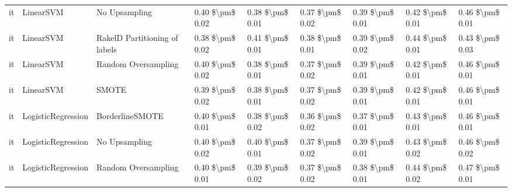 \begin{tabular}{lllllllll}
      it &                       LinearSVM &                 No Upsampling & 0.40 \$\textbackslash pm\$ 0.02 &           0.38 \$\textbackslash pm\$ 0.01 &       0.37 \$\textbackslash pm\$ 0.02 &        0.39 \$\textbackslash pm\$ 0.01 &                         0.42 \$\textbackslash pm\$ 0.01 &     0.46 \$\textbackslash pm\$ 0.01 \\
      it &                       LinearSVM & RakelD Partitioning of labels & 0.38 \$\textbackslash pm\$ 0.02 &           0.41 \$\textbackslash pm\$ 0.01 &       0.38 \$\textbackslash pm\$ 0.01 &        0.39 \$\textbackslash pm\$ 0.02 &                         0.44 \$\textbackslash pm\$ 0.01 &     0.43 \$\textbackslash pm\$ 0.03 \\
      it &                       LinearSVM &           Random Oversampling & 0.40 \$\textbackslash pm\$ 0.02 &           0.38 \$\textbackslash pm\$ 0.01 &       0.37 \$\textbackslash pm\$ 0.02 &        0.39 \$\textbackslash pm\$ 0.01 &                         0.42 \$\textbackslash pm\$ 0.01 &     0.46 \$\textbackslash pm\$ 0.01 \\
      it &                       LinearSVM &                         SMOTE & 0.39 \$\textbackslash pm\$ 0.02 &           0.38 \$\textbackslash pm\$ 0.01 &       0.37 \$\textbackslash pm\$ 0.02 &        0.39 \$\textbackslash pm\$ 0.01 &                         0.42 \$\textbackslash pm\$ 0.01 &     0.46 \$\textbackslash pm\$ 0.01 \\
      it &              LogisticRegression &               BorderlineSMOTE & 0.40 \$\textbackslash pm\$ 0.01 &           0.38 \$\textbackslash pm\$ 0.02 &       0.36 \$\textbackslash pm\$ 0.02 &        0.37 \$\textbackslash pm\$ 0.01 &                         0.43 \$\textbackslash pm\$ 0.01 &     0.46 \$\textbackslash pm\$ 0.01 \\
      it &              LogisticRegression &                 No Upsampling & 0.40 \$\textbackslash pm\$ 0.02 &           0.40 \$\textbackslash pm\$ 0.01 &       0.37 \$\textbackslash pm\$ 0.02 &        0.39 \$\textbackslash pm\$ 0.01 &                         0.43 \$\textbackslash pm\$ 0.02 &     0.46 \$\textbackslash pm\$ 0.02 \\
      it &              LogisticRegression &           Random Oversampling & 0.40 \$\textbackslash pm\$ 0.01 &           0.39 \$\textbackslash pm\$ 0.02 &       0.37 \$\textbackslash pm\$ 0.02 &        0.38 \$\textbackslash pm\$ 0.01 &                         0.44 \$\textbackslash pm\$ 0.02 &     0.47 \$\textbackslash pm\$ 0.01 \\

\end{tabular}
